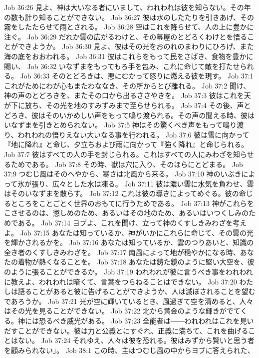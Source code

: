 Job 36:26  見よ、神は大いなる者にいまして、われわれは彼を知らない。その年の数も計り知ることができない。
Job 36:27  彼は水のしたたりを引きあげ、その霧をしたたらせて雨とされる。
Job 36:28  空はこれを降らせて、人の上に豊かに注ぐ。
Job 36:29  だれか雲の広がるわけと、その幕屋のとどろくわけとを悟ることができようか。
Job 36:30  見よ、彼はその光をおのれのまわりにひろげ、また海の底をおおわれる。
Job 36:31  彼はこれらをもって民をさばき、食物を豊かに賜い、
Job 36:32  いなずまをもってもろ手を包み、これに命じて敵を打たせられる。
Job 36:33  そのとどろきは、悪にむかって怒りに燃える彼を現す。
Job 37:1  これがためにわが心もまたわななき、その所からとび離れる。
Job 37:2  聞け、神の声のとどろきを、またその口から出るささやきを。
Job 37:3  彼はこれを天が下に放ち、その光を地のすみずみまで至らせられる。
Job 37:4  その後、声とどろき、彼はそのいかめしい声をもって鳴り渡られる。その声の聞える時、彼はいなずまを引きとめられない。
Job 37:5  神はその驚くべき声をもって鳴り渡り、われわれの悟りえない大いなる事を行われる。
Job 37:6  彼は雪に向かって『地に降れ』と命じ、夕立ちおよび雨に向かって『強く降れ』と命じられる。
Job 37:7  彼はすべての人の手を封じられる。これはすべての人にみわざを知らせるためである。
Job 37:8  その時、獣は穴に入り、そのほらにとどまる。
Job 37:9  つむじ風はそのへやから、寒さは北風から来る。
Job 37:10  神のいぶきによって氷が張り、広々とした水は凍る。
Job 37:11  彼は濃い雲に水気を負わせ、雲はそのいなずまを散らす。
Job 37:12  これは彼の導きによってめぐる。彼の命じるところをことごとく世界のおもてに行うためである。
Job 37:13  神がこれらをこさせるのは、懲しめのため、あるいはその地のため、あるいはいつくしみのためである。
Job 37:14  ヨブよ、これを聞け、立って神のくすしきみわざを考えよ。
Job 37:15  あなたは知っているか、神がいかにこれらに命じて、その雲の光を輝かされるかを。
Job 37:16  あなたは知っているか、雲のつりあいと、知識の全き者のくすしきみわざを。
Job 37:17  南風によって地が穏やかになる時、あなたの着物が熱くなることを。
Job 37:18  あなたは鋳た鏡のように堅い大空を、彼のように張ることができるか。
Job 37:19  われわれが彼に言うべき事をわれわれに教えよ、われわれは暗くて、言葉をつらねることはできない。
Job 37:20  わたしは語ることがあると彼に告げることができようか、人は滅ぼされることを望むであろうか。
Job 37:21  光が空に輝いているとき、風過ぎて空を清めると、人々はその光を見ることができない。
Job 37:22  北から黄金のような輝きがでてくる。神には恐るべき威光がある。
Job 37:23  全能者は――われわれはこれを見いだすことができない。彼は力と公義とにすぐれ、正義に満ちて、これを曲げることはない。
Job 37:24  それゆえ、人々は彼を恐れる。彼はみずから賢いと思う者を顧みられない」。
Job 38:1  この時、主はつむじ風の中からヨブに答えられた、
